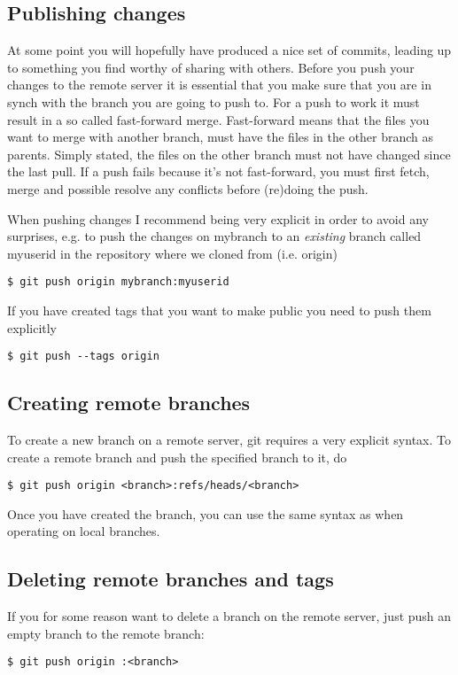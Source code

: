 \documentclass[a4paper,10pt]{article}
\begin{document}
\subsection{Publishing changes}
At some point you will hopefully have produced a nice set of commits, leading
up to something you find worthy of sharing with others. Before you
push your changes to the remote server it is essential that you make sure that 
you are in synch with the branch you are going to push to. For a push to work
it must result in a so called fast-forward merge.
Fast-forward means that the files you want to merge with another branch, must
have the files in the other branch as parents.  Simply stated, the files on
the other branch must not have changed since the last pull. If a push fails
because it’s not fast-forward, you must first fetch, merge and possible
resolve any conflicts before (re)doing the push.

When pushing changes I recommend being very explicit in order to avoid any
surprises, e.g. to push the changes on mybranch to an \emph{existing} branch
called myuserid in the repository where we cloned from (i.e. origin) 
\begin{verbatim}
$ git push origin mybranch:myuserid
\end{verbatim}
If you have created tags that you want to make public you need to push them
explicitly
\begin{verbatim}
$ git push --tags origin 
\end{verbatim}

\subsection{Creating remote branches} 
To create a new branch on a remote server, git
requires a very explicit syntax. To create a remote 
branch and push the specified branch to it, do
\begin{verbatim}
$ git push origin <branch>:refs/heads/<branch>
\end{verbatim}
Once you have created the branch, you can
use the same syntax as when operating on local branches. 

\subsection{Deleting remote branches and tags}
If you for some reason want to delete a branch
on the remote server, just push an empty branch to the remote branch:
\begin{verbatim}
$ git push origin :<branch>
\end{verbatim}
\end{document}
